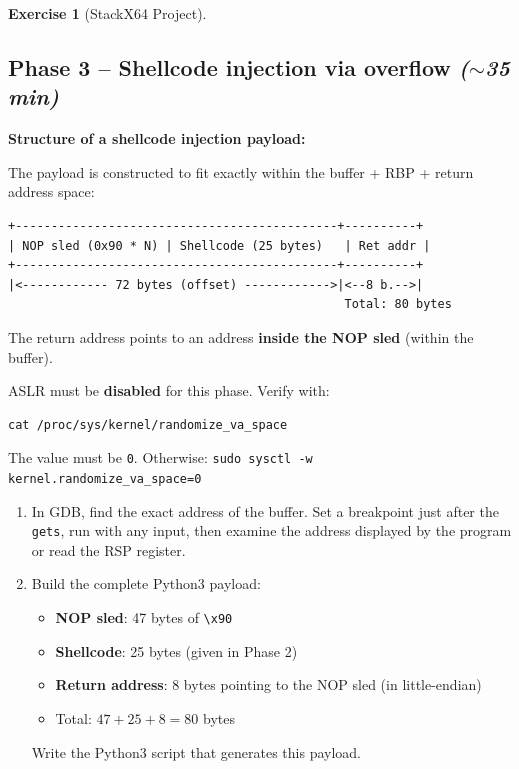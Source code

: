 \documentclass[a4paper,11pt]{article}
\theoremstyle{plain}
\theoremstyle{definition}
\newtheorem{exercice}{Exercise}
\begin{document}
\begin{exercice}[StackX64 Project]
\subsection*{Phase 3 -- Shellcode injection via overflow \hfill\normalfont\textit{($\sim$35 min)}}

\begin{rappel}
\textbf{Structure of a shellcode injection payload:}

The payload is constructed to fit exactly within the buffer + RBP + return address space:

\begin{lstlisting}[style=GDBStyle]
+---------------------------------------------+----------+
| NOP sled (0x90 * N) | Shellcode (25 bytes)   | Ret addr |
+---------------------------------------------+----------+
|<------------ 72 bytes (offset) ------------>|<--8 b.-->|
                                               Total: 80 bytes
\end{lstlisting}

The return address points to an address \textbf{inside the NOP sled} (within the buffer).
\end{rappel}

\begin{attention}
ASLR must be \textbf{disabled} for this phase. Verify with:
\begin{lstlisting}[style=GDBStyle]
cat /proc/sys/kernel/randomize_va_space
\end{lstlisting}
The value must be \texttt{0}. Otherwise: \texttt{sudo sysctl -w kernel.randomize\_va\_space=0}
\end{attention}

\begin{enumerate}
\item[\textbf{3a)}] In GDB, find the exact address of the buffer. Set a breakpoint just after the \texttt{gets}, run with any input, then examine the address displayed by the program or read the RSP register.

\item[\textbf{3b)}] Build the complete Python3 payload:
\begin{itemize}
    \item \textbf{NOP sled}: 47 bytes of \texttt{\textbackslash x90}
    \item \textbf{Shellcode}: 25 bytes (given in Phase 2)
    \item \textbf{Return address}: 8 bytes pointing to the NOP sled (in little-endian)
    \item Total: $47 + 25 + 8 = 80$ bytes
\end{itemize}
Write the Python3 script that generates this payload.


\end{enumerate}
\end{exercice}
\end{document}

